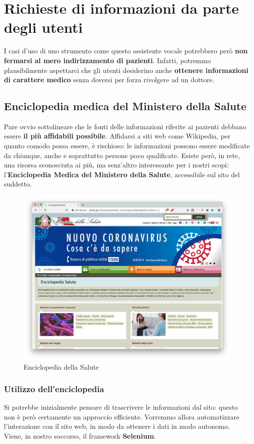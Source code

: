 \chapter{Richieste di informazioni da parte degli utenti}
\label{chap:informations}
I casi d'uso di uno strumento come questo assistente vocale potrebbero però \textbf{non fermarsi al mero indirizzamento di pazienti}. Infatti, potremmo plausibilmente aspettarci che gli utenti desiderino anche \textbf{ottenere informazioni di carattere medico} senza doversi per forza rivolgere ad un dottore.
\section{Enciclopedia medica del Ministero della Salute}
Pare ovvio sottolineare che le fonti delle informazioni riferite ai pazienti debbano essere \textbf{il più affidabili possibile}. Affidarsi a siti web come Wikipedia, per quanto comodo possa essere, è rischioso: le informazioni possono essere modificate da chiunque, anche e soprattutto persone poco qualificate.
Esiste però, in rete, una risorsa sconosciuta ai più, ma senz'altro interessante per i nostri scopi: l'\textbf{Enciclopedia Medica del Ministero della Salute}, accessibile sul sito del suddetto.
\begin{figure}[h]
    \begin{center}
        \includegraphics[width=0.8\columnwidth]{images/informations/MinSalute.jpg}
    \end{center}
    \caption{Enciclopedia della Salute}
    \label{fig:min-salute}
\end{figure}
\subsection{Utilizzo dell'enciclopedia}
Si potrebbe inizialmente pensare di trascrivere le informazioni dal sito: questo non è però certamente un approccio efficiente. Vorremmo allora automatizzare l'interazione con il sito web, in modo da ottenere i dati in modo autonomo. Viene, in nostro soccorso, il framework \textbf{Selenium}.

